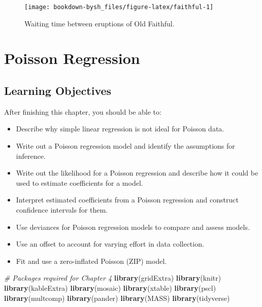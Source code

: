 \documentclass[
]{krantz}
\newenvironment{Shaded}{\begin{snugshade}}{\end{snugshade}}
\newcommand{\CommentTok}[1]{\textcolor[rgb]{0.37,0.37,0.37}{\textit{#1}}}
\newcommand{\KeywordTok}[1]{\textcolor[rgb]{0.27,0.27,0.27}{\textbf{#1}}}
\newcommand{\NormalTok}[1]{#1}
\providecommand{\tightlist}{%
  \setlength{\itemsep}{0pt}\setlength{\parskip}{0pt}}
\begin{document}
\begin{figure}

{\centering \texttt{[image: bookdown-bysh\_files/figure-latex/faithful-1]} 

}

\caption{Waiting time between eruptions of Old Faithful.}\label{fig:faithful}
\end{figure}

\hypertarget{ch-poissonreg}{%
\chapter{Poisson Regression}\label{ch-poissonreg}}

\hypertarget{learning-objectives-3}{%
\section{Learning Objectives}\label{learning-objectives-3}}

After finishing this chapter, you should be able to:

\begin{itemize}
\tightlist
\item
  Describe why simple linear regression is not ideal for Poisson data.
\item
  Write out a Poisson regression model and identify the assumptions for inference.
\item
  Write out the likelihood for a Poisson regression and describe how it could be used to estimate coefficients for a model.
\item
  Interpret estimated coefficients from a Poisson regression and construct confidence intervals for them.
\item
  Use deviances for Poisson regression models to compare and assess models.
\item
  Use an offset to account for varying effort in data collection.
\item
  Fit and use a zero-inflated Poisson (ZIP) model.
\end{itemize}

\begin{Shaded}
\begin{Highlighting}[]
\CommentTok{# Packages required for Chapter 4}
\KeywordTok{library}\NormalTok{(gridExtra)}
\KeywordTok{library}\NormalTok{(knitr)}
\KeywordTok{library}\NormalTok{(kableExtra)}
\KeywordTok{library}\NormalTok{(mosaic)}
\KeywordTok{library}\NormalTok{(xtable)}
\KeywordTok{library}\NormalTok{(pscl) }
\KeywordTok{library}\NormalTok{(multcomp)}
\KeywordTok{library}\NormalTok{(pander)}
\KeywordTok{library}\NormalTok{(MASS)}
\KeywordTok{library}\NormalTok{(tidyverse)}
\end{Highlighting}
\end{Shaded}
\end{document}
